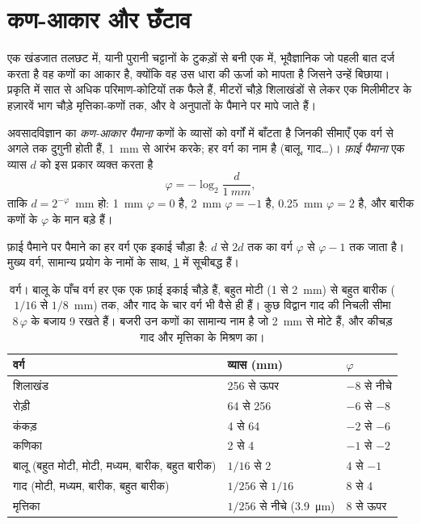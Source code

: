 \section{कण-आकार और छँटाव}\label{sec:b1:clastic-sediments:grain-size}

एक खंडजात तलछट में, यानी पुरानी चट्टानों के टुकड़ों से बनी एक में, भूवैज्ञानिक जो पहली बात दर्ज करता है वह कणों का आकार है, क्योंकि वह उस धारा की ऊर्जा को मापता है जिसने उन्हें बिछाया। प्रकृति में  सात से अधिक परिमाण-कोटियों तक फैले हैं, मीटरों चौड़े शिलाखंडों से लेकर एक मिलीमीटर के हज़ारवें भाग चौड़े मृत्तिका-कणों तक, और वे अनुपातों के पैमाने पर मापे जाते हैं।

\begin{definition}[कण-आकार पैमाना, फ़ाई पैमाना]\label{def:b1:clastic-sediments:grain-size}
अवसादविज्ञान का \emph{कण-आकार पैमाना} कणों के व्यासों को वर्गों में बाँटता है जिनकी सीमाएँ एक वर्ग से अगले तक दुगुनी होती हैं, \qty{1}{mm} से आरंभ करके; हर वर्ग का नाम है (बालू, गाद\ldots)। \emph{फ़ाई पैमाना} एक व्यास $d$ को इस प्रकार व्यक्त करता है
\[
  \varphi = -\log_2 \frac{d}{\qty{1}{mm}},
\]
ताकि $d = 2^{-\varphi}$~mm हो: \qty{1}{mm} $\varphi = 0$ है, \qty{2}{mm} $\varphi = -1$ है, \qty{0.25}{mm} $\varphi = 2$ है, और बारीक कणों के $\varphi$ के मान बड़े हैं।
\end{definition}

फ़ाई पैमाने पर  पैमाने का हर वर्ग एक इकाई चौड़ा है: $d$ से $2d$ तक का वर्ग $\varphi$ से $\varphi - 1$ तक जाता है। मुख्य वर्ग, सामान्य प्रयोग के नामों के साथ, \cref{tab:b1:clastic-sediments:classes} में सूचीबद्ध हैं।

\begin{table}[htbp]
\centering\small
\begin{tabular}{@{}lll@{}}
\hline
वर्ग & व्यास (\si{mm}) & $\varphi$ \\
\hline
शिलाखंड & 256 से ऊपर & $-8$ से नीचे \\
रोड़ी & 64 से 256 & $-6$ से $-8$ \\
कंकड़ & 4 से 64 & $-2$ से $-6$ \\
कणिका & 2 से 4 & $-1$ से $-2$ \\
बालू (बहुत मोटी, मोटी, मध्यम, बारीक, बहुत बारीक) & $1/16$ से 2 & 4 से $-1$ \\
गाद (मोटी, मध्यम, बारीक, बहुत बारीक) & $1/256$ से $1/16$ & 8 से 4 \\
मृत्तिका & $1/256$ से नीचे (\qty{3.9}{\micro m}) & 8 से ऊपर \\
\hline
\end{tabular}
\caption{ वर्ग। बालू के पाँच वर्ग हर एक एक फ़ाई इकाई चौड़े हैं, बहुत मोटी (1 से \qty{2}{mm}) से बहुत बारीक ($1/16$ से
$1/8$~mm) तक, और गाद के चार वर्ग भी वैसे ही हैं। कुछ विद्वान गाद की निचली सीमा $8\,\varphi$ के बजाय 9 रखते हैं। बजरी उन कणों का सामान्य नाम है जो \qty{2}{mm} से मोटे हैं, और कीचड़ गाद और मृत्तिका के मिश्रण का।}
\label{tab:b1:clastic-sediments:classes}
\end{table}

